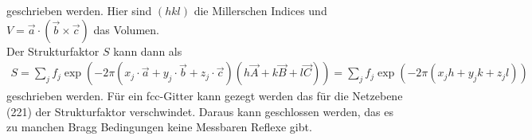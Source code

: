 geschrieben werden. Hier sind $(hkl)$ die Millerschen Indices und $V=\vec{a}\cdot(\vec{b}\times\vec{c})$ das Volumen.\\
Der Strukturfaktor $S$ kann dann als
\begin{align}
	S = \sum_j f_j\exp(-2\pi\left(x_j\cdot\vec{a}+y_j\cdot\vec{b}+z_j\cdot\vec{c}\right)\left(h\vec{A}+k\vec{B}+l\vec{C}\right) )=\sum_jf_j\exp(-2\pi\left(x_jh+y_jk+z_jl\right))
\end{align}
geschrieben werden. Für ein fcc-Gitter kann gezegt werden das für die Netzebene (221) der Strukturfaktor verschwindet. Daraus kann geschlossen werden, das es zu manchen Bragg Bedingungen keine Messbaren Reflexe gibt.